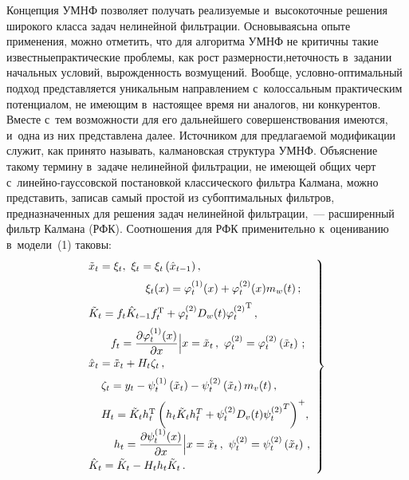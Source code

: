 \begin{multicols}{2}
    Концепция УМНФ позволяет получать реализуемые и~высокоточные 
решения широкого класса задач нелинейной фильтрации. Основываясь\linebreak на 
опыте применения, можно отметить, что для алгоритма УМНФ не критичны 
такие известные\linebreak практические проблемы, как рост раз\-мер\-ности,\linebreak не\-точ\-ность 
в~задании начальных условий, вы\-рож\-ден\-ность возмущений. Вообще,  
услов\-но-оп\-ти\-маль\-ный подход представляется уникальным направлением 
с~колоссальным практическим потенциалом, не имеющим в~настоящее время 
ни аналогов, ни конкурентов. Вместе с~тем возможности для его дальнейшего 
совершенствования имеются, и~одна из них представлена далее. Источником 
для предлагаемой модификации служит, как принято называть, калмановская 
структура УМНФ. Объяснение такому термину в~задаче нелинейной 
фильтрации, не имеющей общих черт с~ли\-ней\-но-гаус\-сов\-ской постановкой 
классического фильтра Калмана, можно представить, записав самый простой из 
субоптимальных фильтров, предназначенных для решения задач нелинейной 
фильтрации,~--- расширенный фильтр Калмана (РФК). Соотношения для РФК 
применительно к~оцениванию в~модели~(1) таковы:
    \begin{equation}
    \left.
    \begin{array}{l}
   \hspace*{-2mm} \tilde{x}_t=\xi_t,\  \xi_t=\xi_t\left( \hat{x}_{t-1}\right),\\[6pt]
     \hspace*{16mm}\xi_t(x)= \varphi_t^{(1)}(x)+\varphi_t^{(2)}(x) m_w(t)\,;\\[6pt]
   \hspace*{-2mm} \tilde{K}_t=f_t\hat{K}_{t-1} f_t^{\mathrm{T}}+\varphi_t^{(2)} D_w (t) 
{\varphi_t^{(2)}}^{\mathrm{T}}\,,\\[6pt]
\hspace*{5mm} f_t= \fr{\partial \varphi_t^{(1)}(x)} {\partial x}\Big\vert x= 
\tilde{x}_t\,,\ \varphi_t^{(2)}=\varphi_t^{(2)}\left( \tilde{x}_t\right)\,;\\[6pt]
    \hspace*{-2mm}\hat{x}_t=\tilde{x}_t+H_t\zeta_t\,,\\[6pt]
     \hspace*{2mm}\zeta_t= y_t-\psi_t^{(1)}\left( 
\tilde{x}_t\right)-\psi_t^{(2)}\left(\tilde{x}_t\right) m_v(t)\,,\\[6pt]
   \hspace*{2mm} H_t=\tilde{K}_t h_t^{\mathrm{T}} \left( h_t \tilde{K}_t h_t^T +\psi_t^{(2)} D_v(t) 
{\psi_t^{(2)}}^T\right)^+\!,\\[6pt] 
   \hspace*{6mm} h_t=\fr{\partial \psi_t^{(1)}(x)}{\partial x}\Big\vert x= \tilde{x}_t\,,\ 
\psi_t^{(2)}=\psi_t^{(2)}\left( \tilde{x}_t\right)\,,\\[6pt]
    \hspace*{-2mm}\hat{K}_t=\tilde{K}_t-H_t h_t \tilde{K}_t\,.
    \end{array}
    \right\}
    \label{e7-bos}
    \end{equation}
    

\end{multicols}

